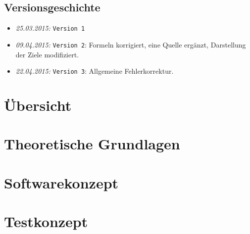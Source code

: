 \documentclass{fhnwreport/fhnwreport}
\begin{document}


\tableofcontents
\vspace{80mm}
\subsection*{Versionsgeschichte}
\begin{itemize}
    \item[]
        \emph{25.03.2015:} \texttt{Version 1}
    \item[]
        \emph{09.04.2015:} \texttt{Version 2}: Formeln korrigiert, eine Quelle erg\"anzt, Darstellung der Ziele modifiziert.
    \item[]
        \emph{22.04.2015:} \texttt{Version 3}: Allgemeine Fehlerkorrektur.
\end{itemize}
\clearpage

\section{\"Ubersicht}
\label{sec:ubersicht}


\clearpage
\section{Theoretische Grundlagen}
\label{sec:theor_basics}


\clearpage
\section{Softwarekonzept}
\label{sec:softwarekonzept}


\clearpage
\section{Testkonzept}
\label{sec:testkonzept}

\end{document}
